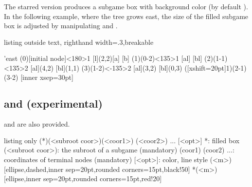 \subsubsection{\protect\cmd{\xtSubgameBox*}}

The starred version \icmd{\xtSubgameBox*} produces a subgame box with background color (by default ).
In the following example, where the tree grows east, the size of the filled subgame box is adjusted by manipulating  and .

\begin{tcblisting}{listing outside text, righthand width=.3\linewidth,breakable}
\begin{istgame}
\setistgrowdirection'{east}
\xtdistance{15mm}{30mm}
\istroot[45](0)[initial node]<180>{1}
          [l]{(2,2)}[a]  [b]   \endist 
\istroot(1)(0-2)<135>{1}
                   [al]  [bl]  \endist 
\xtdistance{10mm}{20mm}
\istroot(2)(1-1)<135>{2}
  \istb{\ell}[al]{(4,2)}  [bl]{(1,1)}  \endist 
\istroot(3)(1-2)<-135>{2}
  \istb{\ell}[al]{(3,2)}  [bl]{(0,3)}  \endist 
\xtSubgameBox*([xshift=20pt]1){(2-1)(3-2)}%
    [inner xsep=30pt]
\end{istgame}
\end{tcblisting}


\subsection{\protect\cmd{\xtSubgameOval} and \protect\cmd{\xtSubgameOval*} (experimental)}

\icmd{\xtSubgameOval} and \icmd{\xtSubgameOval*} are also provided.

\begin{tcblisting}{listing only}
  \xtSubgameOval(*)(<subroot coor>){(<coor1>) (<coor2>) ... }[<opt>]
  *: filled box
  (<subroot coor>): the subroot of a subgame (mandatory)
  {(coor1) (coor2) ...}: coordinates of terminal nodes (mandatory)
  [<opt>]: color, line style
  (<m>){}[ellipse,dashed,inner sep=20pt,rounded corners=15pt,black!50]
  *(<m>){}[ellipse,inner sep=20pt,rounded corners=15pt,red!20]
\end{tcblisting}



